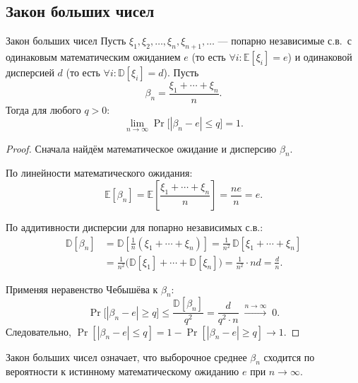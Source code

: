 \subsection{Закон больших чисел}

\begin{Theorem}{Закон больших чисел}{}
	Пусть $\xi_1, \xi_2, \ldots, \xi_n, \xi_{n+1}, \ldots$ — попарно независимые с.в.\ с одинаковым математическим ожиданием $e$ (то есть $\forall i\colon \mathbb{E}[\xi_i] = e$) и одинаковой дисперсией $d$ (то есть $\forall i\colon \mathbb{D}[\xi_i] = d$). Пусть
	\[
	\beta_n = \frac{\xi_1 + \cdots + \xi_n}{n}.
	\]
	Тогда для любого $q > 0$:
	\[
	\lim_{n \to \infty} \Pr\bigl[|\beta_n - e| \leq q\bigr] = 1.
	\]
\end{Theorem}

\begin{proof}
	Сначала найдём математическое ожидание и дисперсию $\beta_n$.
	
	По линейности математического ожидания:
	\[
	\mathbb{E}[\beta_n]
	= \mathbb{E}\!\left[\frac{\xi_1 + \cdots + \xi_n}{n}\right]
	= \frac{n e}{n} = e.
	\]
	
	По аддитивности дисперсии для попарно независимых с.в.:
	\begin{align*}
		\mathbb{D}[\beta_n]
		&= \mathbb{D}\!\left[\frac{1}{n}(\xi_1 + \cdots + \xi_n)\right]
		= \frac{1}{n^2}\,\mathbb{D}[\xi_1 + \cdots + \xi_n] \\
		&= \frac{1}{n^2}\bigl(\mathbb{D}[\xi_1] + \cdots + \mathbb{D}[\xi_n]\bigr)
		= \frac{1}{n^2} \cdot nd = \frac{d}{n}.
	\end{align*}
	
	Применяя неравенство Чебышёва к $\beta_n$:
	\[
	\Pr\bigl[|\beta_n - e| \geq q\bigr]
	\leq \frac{\mathbb{D}[\beta_n]}{q^2}
	= \frac{d}{q^2 \cdot n} \;\xrightarrow{n \to \infty}\; 0.
	\]
	Следовательно, $\Pr[|\beta_n - e| \leq q] = 1 - \Pr[|\beta_n - e| \geq q] \to 1$.
\end{proof}

\begin{Remark}{}{}
	Закон больших чисел означает, что выборочное среднее $\beta_n$ сходится по вероятности к истинному математическому ожиданию $e$ при $n \to \infty$.
\end{Remark}